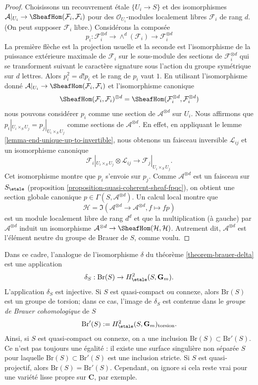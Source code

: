 \begin{proof}
Choisissons un recouvrement \'etale $\{U_i \to S\}$ et des isomorphismes
$\mathcal{A}|_{U_i} \to \SheafHom(\mathcal{F}_i, \mathcal{F}_i)$
pour des $\mathcal{O}_{U_i}$-modules localement libres $\mathcal{F}_i$
de rang $d$. (On peut supposer $\mathcal{F}_i$ libre.) Consid\'erons la
compos\'ee
$$
p_i : \mathcal{F}_i^{\otimes d} \to
\wedge^d(\mathcal{F}_i) \to \mathcal{F}_i^{\otimes d}
$$
La premi\`ere fl\`eche est la projection usuelle et la seconde est
l'isomorphisme de la puissance ext\'erieure maximale de $\mathcal{F}_i$ sur
le sous-module des sections de $\mathcal{F}_i^{\otimes d}$ qui se transforment
suivant le caract\`ere signature sous l'action du groupe sym\'etrique
sur $d$ lettres. Alors $p_i^2 = d! p_i$ et le rang de $p_i$ vaut $1$.
En utilisant l'isomorphisme donn\'e
$\mathcal{A}|_{U_i} \to \SheafHom(\mathcal{F}_i, \mathcal{F}_i)$
et l'isomorphisme canonique
$$
\SheafHom(\mathcal{F}_i, \mathcal{F}_i)^{\otimes d} =
\SheafHom(\mathcal{F}_i^{\otimes d}, \mathcal{F}_i^{\otimes d})
$$
nous pouvons consid\'erer $p_i$ comme une section de $\mathcal{A}^{\otimes d}$
sur $U_i$. Nous affirmons que $p_i|_{U_i \times_S U_j} = p_j|_{U_i \times_S U_j}$
comme sections de $\mathcal{A}^{\otimes d}$. En effet, en appliquant le
lemme \ref{lemma-end-unique-up-to-invertible},
nous obtenons un faisceau inversible $\mathcal{L}_{ij}$ et un isomorphisme canonique
$$
\mathcal{F}_i|_{U_i \times_S U_j} \otimes \mathcal{L}_{ij}
\longrightarrow
\mathcal{F}_j|_{U_i \times_S U_j}.
$$
Cet isomorphisme montre que $p_i$ s'envoie sur $p_j$.
Comme $\mathcal{A}^{\otimes d}$ est un faisceau sur $S_\etale$
(proposition \ref{proposition-quasi-coherent-sheaf-fpqc}), on obtient une
section globale canonique $p \in \Gamma(S, \mathcal{A}^{\otimes d})$. Un calcul local
montre que
$$
\mathcal{H} =
\Im(\mathcal{A}^{\otimes d} \to \mathcal{A}^{\otimes d}, f \mapsto fp)
$$
est un module localement libre de rang $d^d$ et que la multiplication (\`a gauche)
par $\mathcal{A}^{\otimes d}$ induit un isomorphisme
$\mathcal{A}^{\otimes d} \to \SheafHom(\mathcal{H}, \mathcal{H})$.
Autrement dit, $\mathcal{A}^{\otimes d}$ est l'\'el\'ement neutre
du groupe de Brauer de $S$, comme voulu.
\end{proof}

\noindent
Dans ce cadre, l'analogue de l'isomorphisme $\delta$ du
th\'eor\`eme \ref{theorem-brauer-delta}
est une application
$$
\delta_S: \text{Br}(S) \to H_\etale^2(S, \mathbf{G}_m).
$$
L'application $\delta_S$ est injective. Si $S$ est quasi-compact ou
connexe, alors $\text{Br}(S)$ est un groupe de torsion; dans ce cas, l'image
de $\delta_S$ est contenue dans le {\it groupe de Brauer cohomologique} de $S$
$$
\text{Br}'(S) := H_\etale^2(S, \mathbf{G}_m)_\text{torsion}.
$$
Ainsi, si $S$ est quasi-compact ou connexe, on a une inclusion $\text{Br}(S)
\subset \text{Br}'(S)$. Ce n'est pas toujours une \'egalit\'e : il existe une
surface singuli\`ere non s\'epar\'ee $S$ pour laquelle $\text{Br}(S) \subset
\text{Br}'(S)$ est une inclusion stricte. Si $S$ est quasi-projectif, alors
$\text{Br}(S) = \text{Br}'(S)$. Cependant, on ignore si cela reste vrai pour
une vari\'et\'e lisse propre sur $\mathbf{C}$, par exemple.




